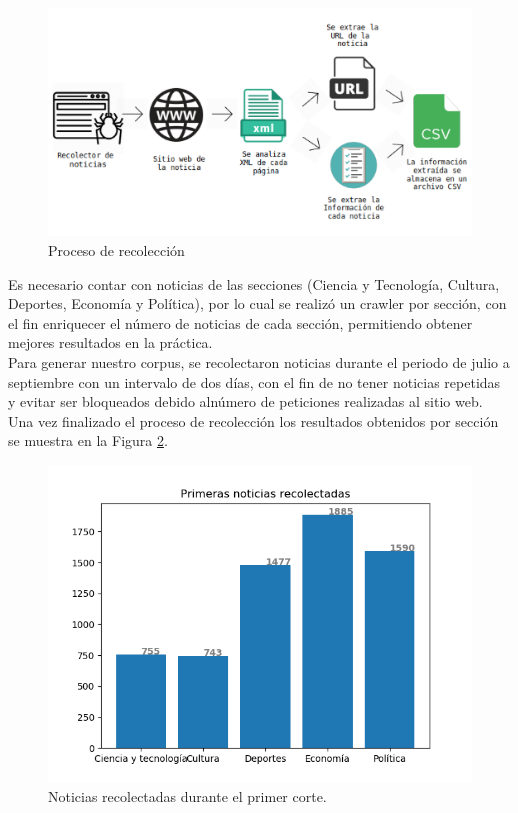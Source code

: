 \begin{figure}[H]
	\centering
	\includegraphics[scale=.2]{imagenes/Capitulo5/recoleccion.png}
	\caption{Proceso de recolección}
	\label{Fig:recoleccion}
\end{figure}

Es necesario contar con noticias de las secciones (Ciencia y Tecnología, Cultura, Deportes, Economía y Política), por lo cual se realizó un crawler por sección, con el fin enriquecer el número de noticias de cada sección, permitiendo obtener mejores resultados en la práctica.
\\
Para generar nuestro corpus, se recolectaron noticias durante el periodo de julio a septiembre con un intervalo de dos días, con el fin de no tener noticias repetidas y evitar ser bloqueados debido alnúmero de peticiones realizadas al sitio web. 
\\
Una vez finalizado el proceso de recolección los resultados obtenidos por sección se muestra en la Figura  \ref{Fig:notseccionV1}.

\begin{figure}[H]
	\centering
	\includegraphics[scale=.6]{imagenes/Capitulo5/noticiasPorSeccionV1.png}
	\caption{Noticias recolectadas durante el primer corte.}
	\label{Fig:notseccionV1}
\end{figure}

